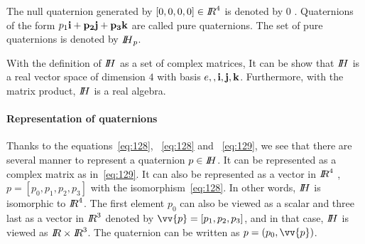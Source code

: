 \begin{definition}
  The null quaternion generated by $[0,0,0,0] \in \mbox{\rm $I\!\!R$}^4$ is denoted by $0$ . Quaternions of the form $p_1 \bf {i} + p_2 \bf{j} + p_3 \bf{k}$ are called pure quaternions. The set of pure quaternions is denoted by $\mbox{\rm $I\!\!H$}_p$.
\end{definition}

With the definition of $\mbox{\rm $I\!\!H$}$ as a set of complex matrices, It can be show that $\mbox{\rm $I\!\!H$}$ is a real vector space of dimension $4$ with basis ${e, \bf, i, j, k}$. Furthermore, with the matrix product, $\mbox{\rm $I\!\!H$}$ is a real algebra.

\paragraph{Representation of quaternions} Thanks to the equations~\eqref{eq:128}, ~\eqref{eq:128} and ~\eqref{eq:129}, we see that there are several manner to represent a quaternion $p\in \mbox{\rm $I\!\!H$}$. It can be represented as a complex matrix as in~\eqref{eq:129}. It can also be represented as a vector in $\mbox{\rm $I\!\!R$}^4$ , $p= [p_0,p_1,p_2,p_3]$ with the isomorphism~\eqref{eq:128}. In other words,  $\mbox{\rm $I\!\!H$}$ is isomorphic to $\mbox{\rm $I\!\!R$}^4$.  The first element $p_0$ can also be viewed as  a scalar and three last as a vector in $\mbox{\rm $I\!\!R$}^3$ denoted by $\vv{p} = [p_1,p_2,p_3]$, and in that case, $\mbox{\rm $I\!\!H$}$ is viewed as $\mbox{\rm $I\!\!R$}\times \mbox{\rm $I\!\!R$}^3$. The quaternion can be written as $p=(p_0,\vv{p})$.

